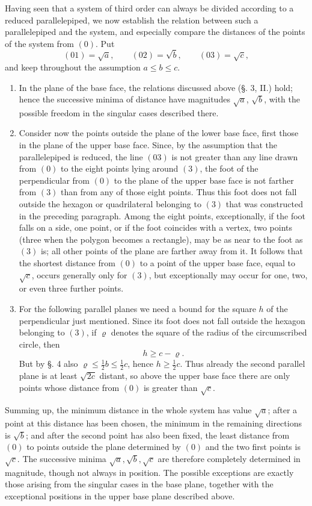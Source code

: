 \documentclass[11pt]{article}
\newcommand{\ordlabel}[1]{#1\textsuperscript{o}}
\begin{document}
Having seen that a system of third order can always be divided according to a reduced parallelepiped, we now establish the relation between such a parallelepiped and the system, and especially compare the distances of the points of the system from $(0)$. Put
\[
 (01)=\sqrt a,
\qquad (02)=\sqrt b,
\qquad (03)=\sqrt c,
\]
and keep throughout the assumption $a\le b\le c$.

\begin{enumerate}
\item[\ordlabel{1}.] In the plane of the base face, the relations discussed above (§. 3, II.) hold; hence the successive minima of distance have magnitudes $\sqrt a$, $\sqrt b$, with the possible freedom in the singular cases described there.
\item[\ordlabel{2}.] Consider now the points outside the plane of the lower base face, first those in the plane of the upper base face. Since, by the assumption that the parallelepiped is reduced, the line $(03)$ is not greater than any line drawn from $(0)$ to the eight points lying around $(3)$, the foot of the perpendicular from $(0)$ to the plane of the upper base face is not farther from $(3)$ than from any of those eight points. Thus this foot does not fall outside the hexagon or quadrilateral belonging to $(3)$ that was constructed in the preceding paragraph. Among the eight points, exceptionally, if the foot falls on a side, one point, or if the foot coincides with a vertex, two points (three when the polygon becomes a rectangle), may be as near to the foot as $(3)$ is; all other points of the plane are farther away from it. It follows that the shortest distance from $(0)$ to a point of the upper base face, equal to $\sqrt c$, occurs generally only for $(3)$, but exceptionally may occur for one, two, or even three further points.
\item[\ordlabel{3}.] For the following parallel planes we need a bound for the square $h$ of the perpendicular just mentioned. Since its foot does not fall outside the hexagon belonging to $(3)$, if $\varrho$ denotes the square of the radius of the circumscribed circle, then
\[
 h\ge c-\varrho.
\]
But by §. 4 also $\varrho\le\frac12 b\le\frac12 c$, hence $h\ge\frac12 c$. Thus already the second parallel plane is at least $\sqrt{2c}$ distant, so above the upper base face there are only points whose distance from $(0)$ is greater than $\sqrt c$.
\end{enumerate}

Summing up, the minimum distance in the whole system has value $\sqrt a$; after a point at this distance has been chosen, the minimum in the remaining directions is $\sqrt b$; and after the second point has also been fixed, the least distance from $(0)$ to points outside the plane determined by $(0)$ and the two first points is $\sqrt c$. The successive minima $\sqrt a,\sqrt b,\sqrt c$ are therefore completely determined in magnitude, though not always in position. The possible exceptions are exactly those arising from the singular cases in the base plane, together with the exceptional positions in the upper base plane described above.
\end{document}
